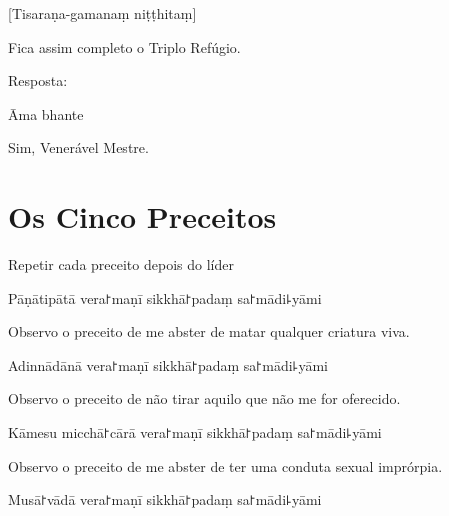 [Tisaraṇa-gamanaṃ niṭṭhitaṃ]

\begin{english}
  Fica assim completo o Triplo Refúgio.
\end{english}

\begin{instruction}
  Resposta:
\end{instruction}

Āma bhante

\begin{english}
  Sim, Venerável Mestre.
\end{english}

\chapter{Os Cinco Preceitos}

\begin{instruction}
  Repetir cada preceito depois do líder
\end{instruction}

\begin{precept}
  \setcounter{enumi}{0}
  \item Pāṇātipātā vera꜓maṇī sikkhā꜓padaṃ sa꜓mādi꜕yāmi
\end{precept}

\begin{english}
  Observo o preceito de me abster de matar qualquer criatura viva.
\end{english}

\begin{precept}
  \setcounter{enumi}{1}
  \item Adinnādānā vera꜓maṇī sikkhā꜓padaṃ sa꜓mādi꜕yāmi
\end{precept}

\begin{english}
  Observo o preceito de não tirar aquilo que não me for oferecido.
\end{english}

\begin{precept}
  \setcounter{enumi}{2}
  \item Kāmesu micchā꜓cārā vera꜓maṇī sikkhā꜓padaṃ sa꜓mādi꜕yāmi
\end{precept}

\begin{english}
  Observo o preceito de me abster de ter uma conduta sexual imprórpia.
\end{english}

\begin{precept}
  \setcounter{enumi}{3}
  \item Musā꜓vādā vera꜓maṇī sikkhā꜓padaṃ sa꜓mādi꜕yāmi
\end{precept}


